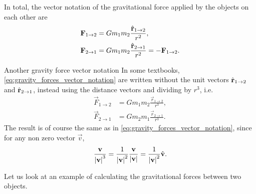 In total, the vector notation of the gravitational force applied by the objects on each other are
\begin{align}
	\mathbf{F}_{1\to2} & = Gm_{1}m_{2}\frac{\hat{\mathbf{r}}_{1\to2}}{r^{2}}\nonumber,           \\
	\mathbf{F}_{2\to1} & = Gm_{1}m_{2}\frac{\hat{\mathbf{r}}_{2\to1}}{r^{2}} = -\mathbf{F}_{1\to2}.
	\label{eq:gravity_forces_vector_notation}
\end{align}

\begin{note}{Another gravity force vector notation}{}
	In some textbooks, \autoref{eq:gravity_forces_vector_notation} are written without the unit vectors $\hat{\mathbf{r}}_{1\to2}$ and $\hat{\mathbf{r}}_{2\to1}$, instead using the distance vectors and dividing by $r^{3}$, i.e.
	\begin{align*}
		\vec{F}_{1\to2} & = Gm_{1}m_{2}\frac{\vec{r}_{1\to2}}{r^{3}}, \\
		\vec{F}_{2\to1} & = Gm_{2}m_{1}\frac{\vec{r}_{2\to1}}{r^{3}}.
	\end{align*}
	The result is of course the same as in \autoref{eq:gravity_forces_vector_notation}, since for any non zero vector $\vec{v}$,
	\begin{align*}
		\frac{\mathbf{v}}{\left| \mathbf{v} \right|^{3}} = \frac{1}{\left| \mathbf{v} \right|^{2}}\frac{\mathbf{v}}{\left| \mathbf{v} \right|} = \frac{1}{\left| \mathbf{v} \right|^{2}}\hat{\mathbf{v}}.
	\end{align*}
\end{note}

Let us look at an example of calculating the gravitational forces between two objects.

